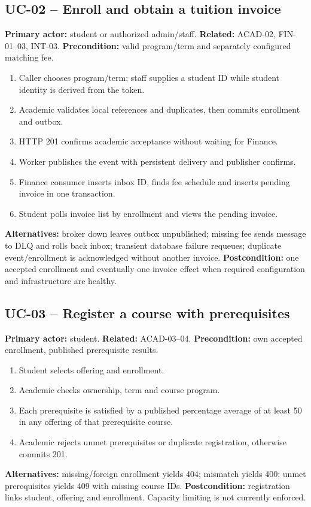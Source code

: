 \documentclass[10pt,a4paper]{article}
\begin{document}
\subsection{UC-02 -- Enroll and obtain a tuition invoice}
\textbf{Primary actor:} student or authorized admin/staff.
\textbf{Related:} ACAD-02, FIN-01--03, INT-03.
\textbf{Precondition:} valid program/term and separately configured matching fee.
\begin{enumerate}
\item Caller chooses program/term; staff supplies a student ID while student identity
is derived from the token.
\item Academic validates local references and duplicates, then commits enrollment and outbox.
\item HTTP 201 confirms academic acceptance without waiting for Finance.
\item Worker publishes the event with persistent delivery and publisher confirms.
\item Finance consumer inserts inbox ID, finds fee schedule and inserts pending invoice in one transaction.
\item Student polls invoice list by enrollment and views the pending invoice.
\end{enumerate}
\textbf{Alternatives:} broker down leaves outbox unpublished; missing fee sends message to
DLQ and rolls back inbox; transient database failure requeues; duplicate event/enrollment
is acknowledged without another invoice. \textbf{Postcondition:} one accepted enrollment
and eventually one invoice effect when required configuration and infrastructure are healthy.

\subsection{UC-03 -- Register a course with prerequisites}
\textbf{Primary actor:} student. \textbf{Related:} ACAD-03--04.
\textbf{Precondition:} own accepted enrollment, published prerequisite results.
\begin{enumerate}
\item Student selects offering and enrollment.
\item Academic checks ownership, term and course program.
\item Each prerequisite is satisfied by a published percentage average of at least 50
in any offering of that prerequisite course.
\item Academic rejects unmet prerequisites or duplicate registration, otherwise commits 201.
\end{enumerate}
\textbf{Alternatives:} missing/foreign enrollment yields 404; mismatch yields 400; unmet
prerequisites yields 409 with missing course IDs. \textbf{Postcondition:} registration
links student, offering and enrollment. Capacity limiting is not currently enforced.
\end{document}
